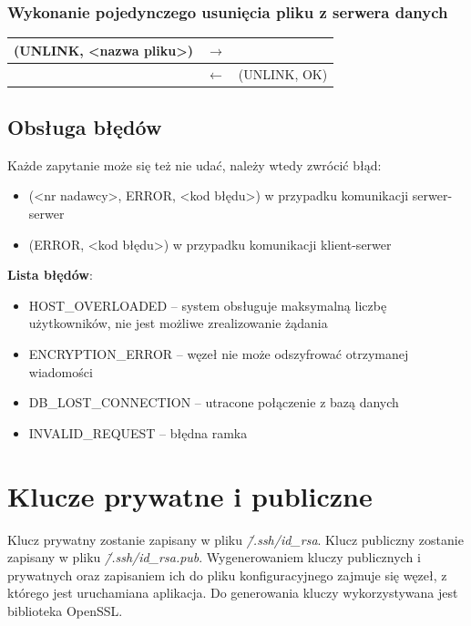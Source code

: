 \subsubsection{Wykonanie pojedynczego usunięcia pliku z serwera danych}

\begin{longtable}{| p{} | p{}| p{} |} 
\hline
(UNLINK, <nazwa pliku>) & $\rightarrow$ &  \\ \hline
 & $\leftarrow$ & (UNLINK, OK) \\ \hline
\end{longtable}

\subsection{Obsługa błędów}
Każde zapytanie może się też nie udać, należy wtedy zwrócić błąd:
\begin{itemize}
\item (<nr nadawcy>, ERROR, <kod błędu>) w przypadku komunikacji serwer-serwer
\item (ERROR, <kod błędu>) w przypadku komunikacji klient-serwer\newline
\end{itemize}

\textbf{Lista błędów}:
\begin{itemize}
\item HOST\_OVERLOADED – system obsługuje maksymalną liczbę użytkowników, nie jest możliwe zrealizowanie żądania
\item ENCRYPTION\_ERROR – węzeł nie może odszyfrować otrzymanej wiadomości
\item DB\_LOST\_CONNECTION – utracone połączenie z bazą danych
\item INVALID\_REQUEST     – błędna ramka

\end{itemize}


\section{Klucze prywatne i publiczne}
Klucz prywatny zostanie zapisany w pliku \textit{\~/.ssh/id\_rsa}.
Klucz publiczny zostanie zapisany w pliku \textit{\~/.ssh/id\_rsa.pub}.
Wygenerowaniem kluczy publicznych i prywatnych oraz zapisaniem ich do pliku
konfiguracyjnego zajmuje się węzeł, z którego jest uruchamiana aplikacja. Do generowania kluczy wykorzystywana jest biblioteka OpenSSL.

